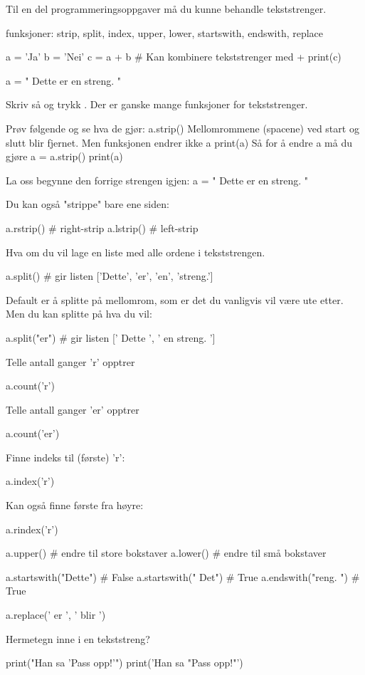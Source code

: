 Til en del programmeringsoppgaver må du kunne behandle tekststrenger.

funksjoner: strip, split, index, upper, lower, startswith, endswith, replace

\begin{usncodebox}
a = 'Ja'
b = 'Nei'
c = a + b    # Kan kombinere tekststrenger med +
print(c)

a = " Dette er en streng.  "
\end{usncodebox}

Skriv så  og trykk . Der er ganske mange funksjoner for tekststrenger.

Prøv følgende og se hva de gjør: 
a.strip()
Mellomrommene (spacene) ved start og slutt blir fjernet.
Men funksjonen endrer ikke a
print(a)
Så for å endre a må du gjøre 
a = a.strip() 
print(a)

La oss begynne den forrige strengen igjen: 
a = " Dette er en streng.  "

Du kan også "strippe" bare ene siden:
\begin{usncodebox}
a.rstrip()    # right-strip
a.lstrip()    # left-strip
\end{usncodebox}

Hva om du vil lage en liste med alle ordene i tekststrengen.
\begin{usncodebox}
a.split()       # gir listen ['Dette', 'er', 'en', 'streng.']
\end{usncodebox}

Default er å splitte på mellomrom, som er det du vanligvis vil være ute etter. Men du kan splitte på hva du vil:
\begin{usncodebox}
a.split("er")   # gir listen [' Dette ', ' en streng.  ']
\end{usncodebox}

Telle antall ganger 'r' opptrer
\begin{usncodebox}
a.count('r')
\end{usncodebox}

Telle antall ganger 'er' opptrer
\begin{usncodebox}
a.count('er')
\end{usncodebox}

Finne indeks til (første) 'r':
\begin{usncodebox}
a.index('r')
\end{usncodebox}

Kan også finne første fra høyre:
\begin{usncodebox}
a.rindex('r')

a.upper()  # endre til store bokstaver
a.lower()  # endre til små bokstaver

a.startswith("Dette")  # False
a.startswith(" Det")   # True
a.endswith("reng.  ")      # True

a.replace(' er ', ' blir ')
\end{usncodebox}


Hermetegn inne i en tekststreng?
\begin{usncodebox}
print("Han sa 'Pass opp!'")
print('Han sa "Pass opp!"')
\end{usncodebox}
